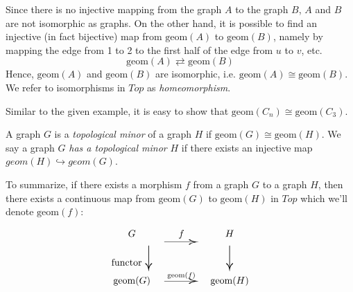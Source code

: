\documentclass{article}
\def\geom{\text{geom}}
\begin{document}
\begin{example}
Since there is no injective mapping from the graph $A$ to the graph $B$, $A$ and $B$ are not isomorphic as graphs. On the other hand, it is possible to find an injective (in fact bijective) map from $\geom(A)$ to $\geom(B)$, namely by mapping the edge from 1 to 2 to the first half of the edge from $u$ to $v$, etc.
\begin{equation*}
    \geom(A) \rightleftarrows \geom(B)
\end{equation*}
Hence, $\geom(A)$ and $\geom(B)$ are isomorphic, i.e. $\geom(A) \cong \geom(B)$. We refer to isomorphisms in $Top$ as \textit{homeomorphism}.
\end{example}

Similar to the given example, it is easy to show that $\geom(C_n) \cong \geom(C_3)$. 

\begin{definition}
A graph $G$ is a \textit{topological minor} of a graph $H$ if $\geom(G) \cong \geom(H)$.  We say a graph $G$ \textit{has a topological minor} $H$ if there exists an injective map  $geom(H) \hookrightarrow geom(G)$.
\end{definition}


To summarize, if there exists a morphism $f$ from a graph $G$ to a graph $H$, then there exists a continuous map from $\geom(G)$ to $\geom(H)$ in $Top$ which we'll denote $\geom(f)$:

\[\begin{array}{ccc}
      G & \underset{\scalebox{4}[1]{\ensuremath{\rightarrow}}}{f}& H \\
     \text{functor} \ \scalebox{1.5}[3]{\ensuremath{\downarrow}} && \scalebox{1.5}[3]{\ensuremath{\downarrow}}\\
     \geom(G) & \overset{\geom(f)}{\scalebox{4}[1]{\ensuremath{\rightarrow}}}& \geom(H) \\
  \end{array}\]
\end{document}

